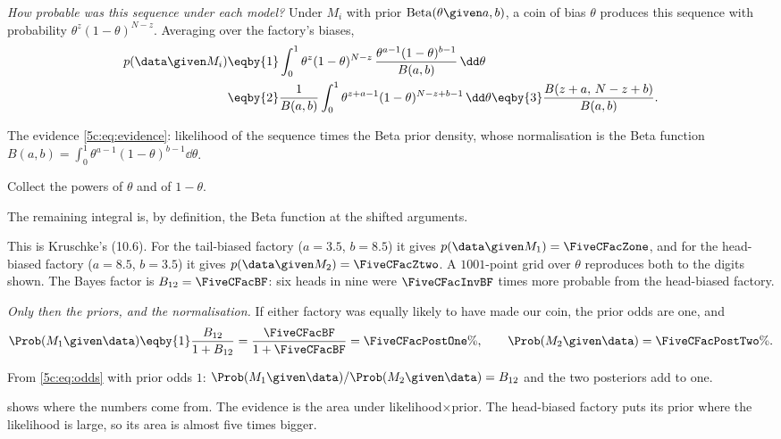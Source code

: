 \emph{How probable was this sequence under each model?} Under $M_i$ with prior
$\mathrm{Beta}(\theta\given a,b)$, a coin of bias $\theta$ produces this sequence
with probability $\theta^z(1-\theta)^{N-z}$. Averaging over the factory's biases,
\begin{align}
  p(\data\given M_i)
  &\eqby{1}\int_0^1\theta^z(1-\theta)^{N-z}\,
     \frac{\theta^{a-1}(1-\theta)^{b-1}}{B(a,b)}\,\dd\theta \nonumber\\
  &\eqby{2}\frac{1}{B(a,b)}\int_0^1\theta^{z+a-1}(1-\theta)^{N-z+b-1}\,\dd\theta
   \eqby{3}\frac{B(z+a,\,N-z+b)}{B(a,b)} .
  \label{5c:eq:beta-evidence}
\end{align}
\begin{explain}
  \item The evidence \eqref{5c:eq:evidence}: likelihood of the sequence times the Beta
        prior density, whose normalisation is the Beta function
        $B(a,b)=\int_0^1\theta^{a-1}(1-\theta)^{b-1}\dd\theta$.
  \item Collect the powers of $\theta$ and of $1-\theta$.
  \item The remaining integral is, by definition, the Beta function at the shifted
        arguments.
\end{explain}
This is Kruschke's (10.6). For the tail-biased factory ($a=3.5$, $b=8.5$) it gives
$p(\data\given M_1)=\FiveCFacZone$, and for the head-biased factory ($a=8.5$,
$b=3.5$) it gives $p(\data\given M_2)=\FiveCFacZtwo$. A $1001$-point grid over
$\theta$ reproduces both to the digits shown. The Bayes factor is
$B_{12}=\FiveCFacBF$: six heads in nine were $\FiveCFacInvBF$ times more probable
from the head-biased factory.

\emph{Only then the priors, and the normalisation.} If either factory was equally
likely to have made our coin, the prior odds are one, and
\begin{align*}
  \Prob(M_1\given\data)
  \eqby{1}\frac{B_{12}}{1+B_{12}}
  =\frac{\FiveCFacBF}{1+\FiveCFacBF}=\FiveCFacPostOne\%,
  \qquad
  \Prob(M_2\given\data)=\FiveCFacPostTwo\% .
\end{align*}
\begin{explain}
  \item From \eqref{5c:eq:odds} with prior odds $1$: $\Prob(M_1\given\data)/\Prob(M_2\given\data)=B_{12}$
        and the two posteriors add to one.
\end{explain}
 shows where the numbers come from. The evidence is the area
under likelihood$\times$prior. The head-biased factory puts its prior where the
likelihood is large, so its area is almost five times bigger.

